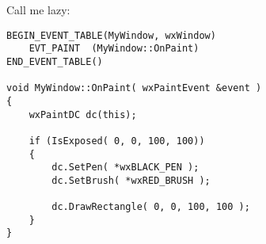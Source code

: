 Call me lazy:

\begin{verbatim}
BEGIN_EVENT_TABLE(MyWindow, wxWindow)
    EVT_PAINT  (MyWindow::OnPaint)
END_EVENT_TABLE()

void MyWindow::OnPaint( wxPaintEvent &event )
{
    wxPaintDC dc(this);
    
    if (IsExposed( 0, 0, 100, 100))
    {
        dc.SetPen( *wxBLACK_PEN );
        dc.SetBrush( *wxRED_BRUSH );
        
        dc.DrawRectangle( 0, 0, 100, 100 );
    }
}
\end{verbatim}


